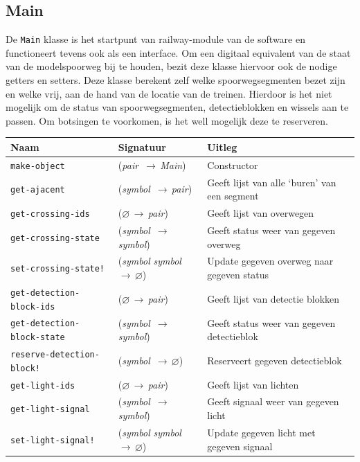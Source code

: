 \documentclass[a4paper, 11pt]{article}
\newcommand{\naar}{\,$\rightarrow$\,}
\renewcommand{\empty}{$\varnothing$}
\newcommand{\<}{\scriptsize\textless\normalsize}
\renewcommand{\>}{\scriptsize\textgreater\normalsize}
\begin{document}
\subsection{Main} %
De \texttt{Main} klasse is het startpunt van railway-module van de software en functioneert tevens ook als een interface. Om een digitaal equivalent van de staat van de modelspoorweg bij te houden, bezit deze klasse hiervoor ook de nodige getters en setters. Deze klasse berekent zelf welke spoorwegsegmenten bezet zijn en welke vrij, aan de hand van de locatie van de treinen. Hierdoor is het niet mogelijk om de status van spoorwegsegmenten, detectieblokken en wissels aan te passen. Om botsingen te voorkomen, is het well mogelijk deze te reserveren.
\begin{table}[H]
	\begin{center}
		\begin{tabular}{|l l l|}
			\hline
			\textbf{Naam} & \textbf{Signatuur} & \textbf{Uitleg}\\
			\hline
			\texttt{make-object} & (\textit{pair} \naar \textit{Main}) & Constructor\\
			\hline
			\texttt{get-ajacent} & (\textit{symbol} \naar \textit{pair}) & Geeft lijst van alle \lq buren' van een segment\\
			\texttt{get-crossing-ids} & (\empty \naar \textit{pair}) & Geeft lijst van overwegen\\
			\texttt{get-crossing-state} & (\textit{symbol} \naar \textit{symbol}) & Geeft status weer van gegeven overweg\\
			\texttt{set-crossing-state!} & (\textit{symbol} \textit{symbol} \naar \empty) & Update gegeven overweg naar gegeven status\\
			\texttt{get-detection-block-ids} & (\empty \naar \textit{pair}) & Geeft lijst van detectie blokken\\
			\texttt{get-detection-block-state} & (\textit{symbol} \naar \textit{symbol}) & Geeft status weer van gegeven detectieblok\\
			\texttt{reserve-detection-block!} & (\textit{symbol} \naar \empty) & Reserveert gegeven detectieblok\\
			\texttt{get-light-ids} & (\empty \naar \textit{pair}) & Geeft lijst van lichten\\
			\texttt{get-light-signal} & (\textit{symbol} \naar \textit{symbol}) & Geeft signaal weer van gegeven licht\\
			\texttt{set-light-signal!} & (\textit{symbol} \textit{symbol} \naar \empty) & Update gegeven licht met gegeven signaal\\

\end{tabular}
\end{center}
\end{table}
\end{document}
